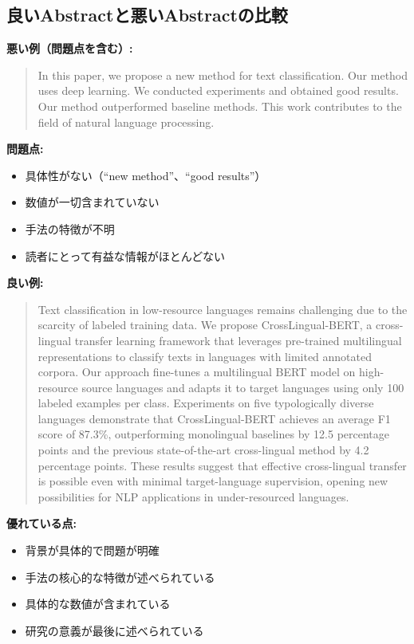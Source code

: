 \subsection{良いAbstractと悪いAbstractの比較}

\textbf{悪い例（問題点を含む）:}

\begin{quote}
In this paper, we propose a new method for text classification. Our method uses deep learning. We conducted experiments and obtained good results. Our method outperformed baseline methods. This work contributes to the field of natural language processing.
\end{quote}

\textbf{問題点:}
\begin{itemize}
\item 具体性がない（``new method''、``good results''）
\item 数値が一切含まれていない
\item 手法の特徴が不明
\item 読者にとって有益な情報がほとんどない
\end{itemize}

\textbf{良い例:}

\begin{quote}
Text classification in low-resource languages remains challenging due to the scarcity of labeled training data. We propose CrossLingual-BERT, a cross-lingual transfer learning framework that leverages pre-trained multilingual representations to classify texts in languages with limited annotated corpora. Our approach fine-tunes a multilingual BERT model on high-resource source languages and adapts it to target languages using only 100 labeled examples per class. Experiments on five typologically diverse languages demonstrate that CrossLingual-BERT achieves an average F1 score of 87.3\%, outperforming monolingual baselines by 12.5 percentage points and the previous state-of-the-art cross-lingual method by 4.2 percentage points. These results suggest that effective cross-lingual transfer is possible even with minimal target-language supervision, opening new possibilities for NLP applications in under-resourced languages.
\end{quote}

\textbf{優れている点:}
\begin{itemize}
\item 背景が具体的で問題が明確
\item 手法の核心的な特徴が述べられている
\item 具体的な数値が含まれている
\item 研究の意義が最後に述べられている
\end{itemize}

